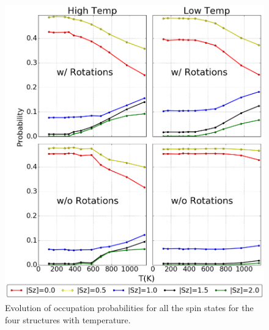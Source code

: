 \documentclass[10pt]{ruthesis}
\begin{document}
{\begin{figure}[H]
 \begin{center}
 \includegraphics[width=\columnwidth]{./plots_final/output/New_Sz.png}
 \caption{Evolution of occupation probabilities for all the spin states for the four structures with temperature. }\label{Sz_all}
 \end{center}
 \end{figure}



}
\end{document}

